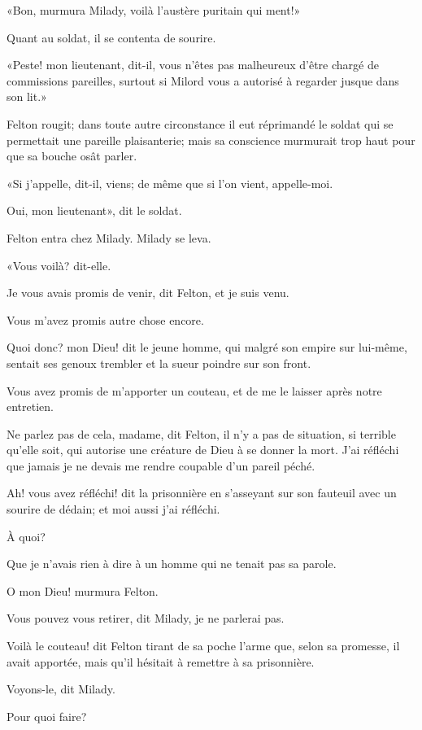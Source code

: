 «Bon, murmura Milady, voilà l'austère puritain qui ment!» 

Quant au soldat, il se contenta de sourire. 

«Peste! mon lieutenant, dit-il, vous n'êtes pas malheureux d'être chargé de commissions pareilles, surtout si Milord vous a autorisé à regarder jusque dans son lit.» 

Felton rougit; dans toute autre circonstance il eut réprimandé le soldat qui se permettait une pareille plaisanterie; mais sa conscience murmurait trop haut pour que sa bouche osât parler. 

«Si j'appelle, dit-il, viens; de même que si l'on vient, appelle-moi. 

\speak  Oui, mon lieutenant», dit le soldat. 

Felton entra chez Milady. Milady se leva. 

«Vous voilà? dit-elle. 

\speak  Je vous avais promis de venir, dit Felton, et je suis venu. 

\speak  Vous m'avez promis autre chose encore. 

\speak  Quoi donc? mon Dieu! dit le jeune homme, qui malgré son empire sur lui-même, sentait ses genoux trembler et la sueur poindre sur son front. 

\speak  Vous avez promis de m'apporter un couteau, et de me le laisser après notre entretien. 

\speak  Ne parlez pas de cela, madame, dit Felton, il n'y a pas de situation, si terrible qu'elle soit, qui autorise une créature de Dieu à se donner la mort. J'ai réfléchi que jamais je ne devais me rendre coupable d'un pareil péché. 

\speak  Ah! vous avez réfléchi! dit la prisonnière en s'asseyant sur son fauteuil avec un sourire de dédain; et moi aussi j'ai réfléchi. 

\speak  À quoi? 

\speak  Que je n'avais rien à dire à un homme qui ne tenait pas sa parole. 

\speak  O mon Dieu! murmura Felton. 

\speak  Vous pouvez vous retirer, dit Milady, je ne parlerai pas. 

\speak  Voilà le couteau! dit Felton tirant de sa poche l'arme que, selon sa promesse, il avait apportée, mais qu'il hésitait à remettre à sa prisonnière. 

\speak  Voyons-le, dit Milady. 

\speak  Pour quoi faire? 

